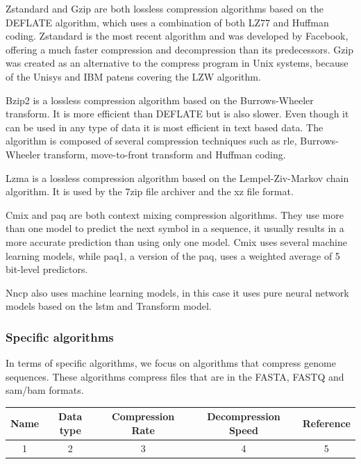 Zstandard and Gzip are both lossless compression algorithms based on the DEFLATE algorithm, which uses a combination of both LZ77 and Huffman coding. Zstandard is the most recent algorithm and was developed by Facebook, offering a much faster compression and decompression than its predecessors. Gzip was created as an alternative to the compress program in Unix systems, because of the Unisys and IBM patens covering the LZW algorithm.

Bzip2 is a lossless compression algorithm based on the Burrows-Wheeler transform. It is more efficient than DEFLATE but is also slower. Even though it can be used in any type of data it is most efficient in text based data. The algorithm is composed of several compression techniques such as \ac{rle}, Burrows-Wheeler transform, move-to-front transform and Huffman coding.

Lzma is a lossless compression algorithm based on the Lempel-Ziv-Markov chain algorithm. It is used by the 7zip file archiver and the xz file format.

Cmix and paq are both context mixing compression algorithms. They use more than one model to predict the next symbol in a sequence, it usually results in a more accurate prediction than using only one model. Cmix uses several machine learning models, while paq1, a version of the paq, uses a weighted average of 5 bit-level predictors.

Nncp also uses machine learning models, in this case it uses pure neural network models based on the \ac{lstm} and Transform model.

\subsubsection{Specific algorithms}

In terms of specific algorithms, we focus on algorithms that compress genome sequences. These algorithms compress files that are in the FASTA, FASTQ and \ac{sam}/\ac{bam} formats.





\begin{center}
    \begin{tabular}{|| c | c | c | c | c ||}
        \hline
        Name & Data type & Compression Rate & Decompression Speed & Reference \\
        \hline\hline
        1 & 2 & 3 & 4 & 5\\
        \hline
    \end{tabular}
\end{center}









